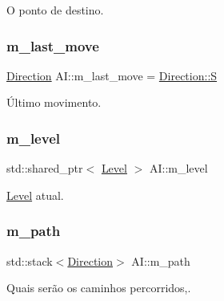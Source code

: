 O ponto de destino. 

\mbox{\label{classAI_a397965e2d5b40c0081711e6e70cab343}} 
\subsubsection{\texorpdfstring{m\+\_\+last\+\_\+move}{m\_last\_move}}
{\footnotesize\ttfamily \hyperlink{game__classes_8hpp_a224b9163917ac32fc95a60d8c1eec3aa}{Direction} A\+I\+::m\+\_\+last\+\_\+move = \hyperlink{game__classes_8hpp_a224b9163917ac32fc95a60d8c1eec3aaa5dbc98dcc983a70728bd082d1a47546e}{Direction\+::S}\hspace{0.3cm}{\ttfamily [private]}}



Último movimento. 

\mbox{\label{classAI_af93a09195c1d191c18db701128c57fc3}} 
\subsubsection{\texorpdfstring{m\+\_\+level}{m\_level}}
{\footnotesize\ttfamily std\+::shared\+\_\+ptr$<$ \hyperlink{classLevel}{Level} $>$ A\+I\+::m\+\_\+level\hspace{0.3cm}{\ttfamily [private]}}



\hyperlink{classLevel}{Level} atual. 

\mbox{\label{classAI_a9d3bece93820828040d6193957da4343}} 
\subsubsection{\texorpdfstring{m\+\_\+path}{m\_path}}
{\footnotesize\ttfamily std\+::stack$<$\hyperlink{game__classes_8hpp_a224b9163917ac32fc95a60d8c1eec3aa}{Direction}$>$ A\+I\+::m\+\_\+path\hspace{0.3cm}{\ttfamily [private]}}



Quais serão os caminhos percorridos,. 

\mbox{\label{classAI_a9756fc935cc86172232373d70b86aa0c}} 
